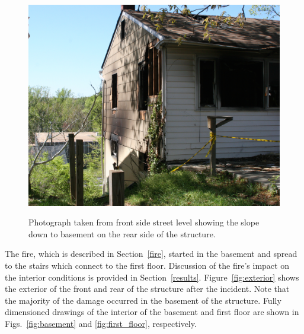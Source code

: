 \documentclass[12pt,oneside]{book}
\begin{document}
\begin{figure}[!ht]
\includegraphics[width=.7\textwidth]{../Figures/PGCo_Slope} \\
\caption[Photograph of terrain.]{Photograph taken from front side street level showing the slope down to basement on the rear side of the structure.}
\label{fig:slope}
\end{figure}


The fire, which is described in Section~\ref{fire}, started in the basement and spread to the stairs which connect to the first floor. Discussion of the fire's impact on the interior conditions is provided in Section~\ref{results}. Figure~\ref{fig:exterior} shows the exterior of the front and rear of the structure after the incident. Note that the majority of the damage occurred in the basement of the structure. Fully dimensioned drawings of the interior of the basement and first floor are shown in Figs.~\ref{fig:basement} and \ref{fig:first_floor}, respectively.
\end{document}
